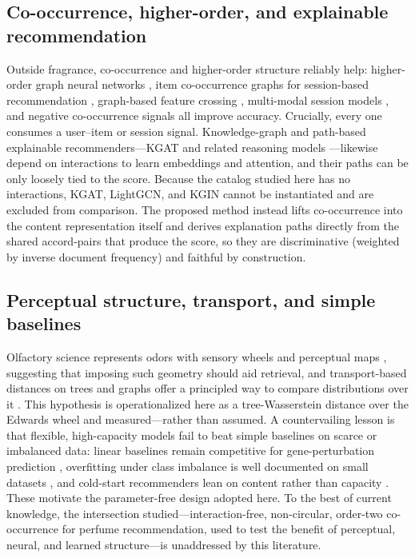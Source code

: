 \documentclass[conference]{IEEEtran}
\begin{document}
\subsection{Co-occurrence, higher-order, and explainable recommendation}
Outside fragrance, co-occurrence and higher-order structure reliably help: higher-order
graph neural networks \cite{r1}, item co-occurrence graphs for session-based
recommendation \cite{r2}, graph-based feature crossing \cite{r3}, multi-modal session
models \cite{r4}, and negative co-occurrence signals \cite{r5} all improve accuracy.
Crucially, every one consumes a user--item or session signal. Knowledge-graph and
path-based explainable recommenders---KGAT \cite{r20} and related reasoning models
\cite{r18,r19,r21}---likewise depend on interactions to learn embeddings and attention,
and their paths can be only loosely tied to the score. Because the catalog studied here
has no interactions, KGAT, LightGCN, and KGIN cannot be instantiated and are excluded from
comparison. The proposed method instead lifts co-occurrence into the content representation
itself and derives explanation paths directly from the shared accord-pairs that produce the
score, so they are discriminative (weighted by inverse document frequency) and faithful by
construction.

\subsection{Perceptual structure, transport, and simple baselines}
Olfactory science represents odors with sensory wheels and perceptual maps
\cite{r10,r11,r12,r13}, suggesting that imposing such geometry should aid retrieval, and
transport-based distances on trees and graphs offer a principled way to compare
distributions over it \cite{r7,r8,r9,r9b}. This hypothesis is operationalized here as a
tree-Wasserstein distance over the Edwards wheel and measured---rather than assumed. A
countervailing lesson is that flexible, high-capacity models fail to beat simple baselines
on scarce or imbalanced data: linear baselines remain competitive for gene-perturbation
prediction \cite{r14}, overfitting under class imbalance is well documented on small
datasets \cite{r15,r16,r17}, and cold-start recommenders lean on content rather than
capacity \cite{r25,r26,r27}. These motivate the parameter-free design adopted here. To the
best of current knowledge, the intersection studied---interaction-free, non-circular,
order-two co-occurrence for perfume recommendation, used to test the benefit of perceptual,
neural, and learned structure---is unaddressed by this literature.
\end{document}
